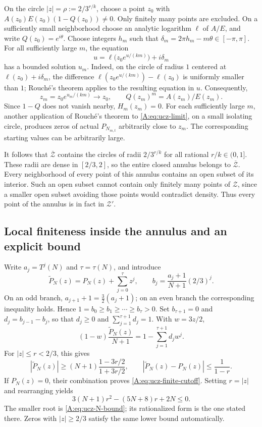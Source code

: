 \documentclass[11pt,a4paper]{article}
\theoremstyle{definition}
\theoremstyle{remark}
\numberwithin{equation}{section}
\begin{document}
On the circle $|z|=\rho:=2/3^{r/k}$, choose a point $z_0$ with
$A(z_0)E(z_0)(1-Q(z_0))\ne0$. Only finitely many points are excluded.
On a sufficiently small neighborhood choose an analytic logarithm
$\ell$ of $A/E$, and write $Q(z_0)=e^{i\theta}$.
Choose integers $h_m$ such that
$\delta_m=2\pi h_m-m\theta\in[-\pi,\pi]$.
For all sufficiently large $m$, the equation
\[
 u=\ell\bigl(z_0 e^{u/(km)}\bigr)+i\delta_m
\]
has a bounded solution $u_m$. Indeed, on the circle of radius $1$
centered at $\ell(z_0)+i\delta_m$, the difference
$\ell(z_0e^{u/(km)})-\ell(z_0)$ is uniformly smaller than $1$;
Rouch\'e's theorem applies to the resulting equation in $u$.
Consequently,
\[
 z_m=z_0e^{u_m/(km)}\longrightarrow z_0,
 \qquad Q(z_m)^m=A(z_m)/E(z_m).
\]
Since $1-Q$ does not vanish nearby, $H_m(z_m)=0$.
For each sufficiently large $m$, another application of Rouch\'e's
theorem to \eqref{A:eq:ucz-limit}, on a small isolating circle, produces
zeros of actual $P_{N_{m,t}}$ arbitrarily close to $z_m$.
The corresponding starting values can be arbitrarily large.

It follows that $\overline{\mathcal Z}$ contains the circles of radii
$2/3^{r/k}$ for all rational $r/k\in(0,1]$. These radii are dense in
$[2/3,2]$, so the entire closed annulus belongs to
$\overline{\mathcal Z}$. Every neighborhood of every point of this
annulus contains an open subset of its interior. Such an open subset
cannot contain only finitely many points of $\mathcal Z$, since a
smaller open subset avoiding those points would contradict density.
Thus every point of the annulus is in fact in $\mathcal Z'$.

\subsection{Local finiteness inside the annulus and an explicit bound}

Write $a_j=T^j(N)$ and $\tau=\tau(N)$, and introduce
\[
 \widetilde P_N(z)=P_N(z)+\sum_{j=0}^{\tau}z^j,
 \qquad b_j=\frac{a_j+1}{N+1}(2/3)^j.
\]
On an odd branch, $a_{j+1}+1=\tfrac32(a_j+1)$; on an even branch the
corresponding inequality holds. Hence
$1=b_0\geq b_1\geq\cdots\geq b_\tau>0$.
Set $b_{\tau+1}=0$ and $d_j=b_{j-1}-b_j$, so that
$d_j\geq0$ and $\sum_{j=1}^{\tau+1}d_j=1$.
With $w=3z/2$,
\[
 (1-w)\frac{\widetilde P_N(z)}{N+1}
 =1-\sum_{j=1}^{\tau+1}d_jw^j.
\]
For $|z|\leq r<2/3$, this gives
\[
 |\widetilde P_N(z)|\geq
 (N+1)\frac{1-3r/2}{1+3r/2},\qquad
 |\widetilde P_N(z)-P_N(z)|\leq\frac1{1-r}.
\]
If $P_N(z)=0$, their combination proves
\eqref{A:eq:ucz-finite-cutoff}. Setting $r=|z|$ and rearranging yields
\[
 3(N+1)r^2-(5N+8)r+2N\leq0.
\]
The smaller root is \eqref{A:eq:ucz-N-bound}; its rationalized form is the
one stated there. Zeros with $|z|\geq2/3$ satisfy the same lower bound
automatically.
\end{document}
